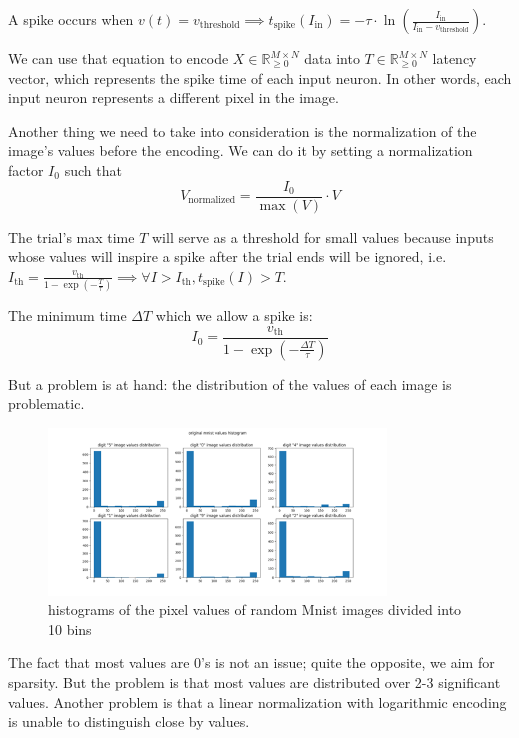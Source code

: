 A spike occurs when $v(t) = v_{\text{threshold}} \implies t_{\text{spike}}(I_{\text{in}}) = -\tau \cdot \ln\left(\frac{I_{\text{in}}}{I_{\text{in}} - v_{\text{threshold}}}\right)$.

We can use that equation to encode $X \in \mathbb{R}_{\geq 0}^{M \times N}$ data into $T \in \mathbb{R}_{\geq 0}^{M \times N}$ latency vector, which represents the spike time of each input neuron. In other words, each input neuron represents a different pixel in the image.

Another thing we need to take into consideration is the normalization of the image's values before the encoding. We can do it by setting a normalization factor $I_0$ such that 
\begin{equation}
V_{\text{normalized}} = \frac{I_0}{\max(V)} \cdot V
\end{equation}

The trial's max time $T$ will serve as a threshold for small values because inputs whose values will inspire a spike after the trial ends will be ignored, i.e. $I_{\text{th}} = \frac{v_{\text{th}}}{1 - \exp\left(-\frac{T}{\tau}\right)} \implies \forall I > I_{\text{th}}, t_{\text{spike}}(I) > T$.

The minimum time $\Delta T$ which we allow a spike is:
\begin{equation}
I_0 = \frac{v_{\text{th}}}{1 - \exp\left(-\frac{\Delta T}{\tau}\right)}
\end{equation}

But a problem is at hand: the distribution of the values of each image is problematic.

\begin{figure}[H]
    \centering
    \includegraphics[width=0.8\textwidth]{methods/spike-encoding/graphs/mnist-values-histogram.png}
    \caption{histograms of the pixel values of random Mnist images divided into 10 bins}
    \label{fig:mnist-values-histogram}
\end{figure}

The fact that most values are 0's is not an issue; quite the opposite, we aim for sparsity. But the problem is that most values are distributed over 2-3 significant values. Another problem is that a linear normalization with logarithmic encoding is unable to distinguish close by values.

